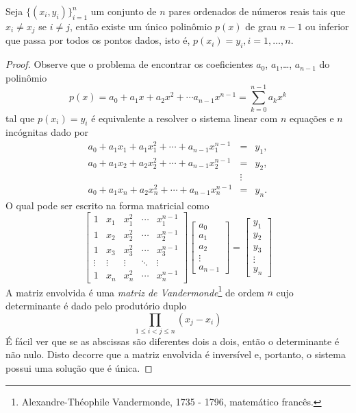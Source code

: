 \begin{teo}\label{teo:interp_poli} Seja $\{(x_i,y_i)\}_{i=1}^{n}$ um conjunto de $n$ pares ordenados de números reais tais que $x_i \ne x_j$ se $i\ne j$, então existe um único polinômio $p(x)$ de grau $n-1$ ou inferior que passa por todos os pontos dados, isto é, $p(x_i)=y_i, i=1,\ldots, n$.
\end{teo}
\begin{proof} Observe que o problema de encontrar os coeficientes $a_0$, $a_1$,\ldots, $a_{n-1}$ do polinômio
$$p(x)=a_0+a_1x+a_2x^2+\cdots a_{n-1}x^{n-1}=\sum_{k=0}^{n-1} a_k x^k$$
tal que $p(x_i)=y_i$ é equivalente a resolver o sistema linear com $n$ equações e $n$ incógnitas dado por
\begin{eqnarray*}
a_0+a_1x_1+a_1x_1^2+\cdots +a_{n-1} x_1^{n-1}&=&y_1,\\
a_0+a_1x_2+a_2x_2^2+\cdots +a_{n-1} x_2^{n-1}&=&y_2,\\
&\vdots&\\
a_0+a_1x_n+a_2x_n^2+\cdots +a_{n-1} x_n^{n-1}&=&y_n.
\end{eqnarray*}
O qual pode ser escrito na forma matricial como
$$\begin{bmatrix}
1 & x_1 & x_1^2 & \cdots & x_1^{n-1}\\
1 & x_2 & x_2^2 & \cdots & x_2^{n-1}\\
1 & x_3 & x_3^2 & \cdots & x_3^{n-1}\\
\vdots&\vdots&\vdots&\ddots&\vdots\\
1 & x_n & x_n^2 & \cdots & x_n^{n-1}
\end{bmatrix}
\begin{bmatrix}
a_0\\a_1\\a_2\\ \vdots \\a_{n-1}
\end{bmatrix}=
\begin{bmatrix}
y_1\\y_2\\y_3\\ \vdots \\y_n
\end{bmatrix}
$$
A matriz envolvida é uma \emph{matriz de Vandermonde}\footnote{Alexandre-Théophile Vandermonde, 1735 - 1796, matemático francês.} de ordem $n$ cujo determinante é dado pelo produtório duplo
$$\prod_{1\leq i<j\leq n}\left(x_j-x_i\right)$$
É fácil ver que se as abscissas são diferentes dois a dois, então o determinante é não nulo. Disto decorre que a matriz envolvida é inversível e, portanto, o sistema possui uma solução que é única.
\end{proof}

